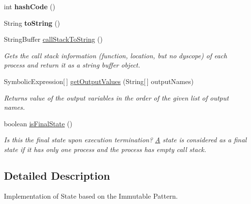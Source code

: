 \begin{DoxyCompactItemize}
\item 
\hypertarget{classedu_1_1udel_1_1cis_1_1vsl_1_1civl_1_1state_1_1common_1_1immutable_1_1ImmutableState_a48efc1dd9996ae1aa123ce1a0b5e66c3}{}int {\bfseries hash\+Code} ()\label{classedu_1_1udel_1_1cis_1_1vsl_1_1civl_1_1state_1_1common_1_1immutable_1_1ImmutableState_a48efc1dd9996ae1aa123ce1a0b5e66c3}

\item 
\hypertarget{classedu_1_1udel_1_1cis_1_1vsl_1_1civl_1_1state_1_1common_1_1immutable_1_1ImmutableState_abcc292e5aeed6b8eba3007833239f175}{}String {\bfseries to\+String} ()\label{classedu_1_1udel_1_1cis_1_1vsl_1_1civl_1_1state_1_1common_1_1immutable_1_1ImmutableState_abcc292e5aeed6b8eba3007833239f175}

\item 
String\+Buffer \hyperlink{classedu_1_1udel_1_1cis_1_1vsl_1_1civl_1_1state_1_1common_1_1immutable_1_1ImmutableState_a3eee65c1506e5fc43db2b12685515e9d}{call\+Stack\+To\+String} ()
\begin{DoxyCompactList}\small\item\em Gets the call stack information (function, location, but no dyscope) of each process and return it as a string buffer object. \end{DoxyCompactList}\item 
Symbolic\+Expression\mbox{[}$\,$\mbox{]} \hyperlink{classedu_1_1udel_1_1cis_1_1vsl_1_1civl_1_1state_1_1common_1_1immutable_1_1ImmutableState_a9a738f032e6add7fb30bd537c455b3c4}{get\+Output\+Values} (String\mbox{[}$\,$\mbox{]} output\+Names)
\begin{DoxyCompactList}\small\item\em Returns value of the output variables in the order of the given list of output names. \end{DoxyCompactList}\item 
boolean \hyperlink{classedu_1_1udel_1_1cis_1_1vsl_1_1civl_1_1state_1_1common_1_1immutable_1_1ImmutableState_a9db201bbce5a4c6ec86e9e441055c15d}{is\+Final\+State} ()
\begin{DoxyCompactList}\small\item\em Is this the final state upon execution termination? \hyperlink{structA}{A} state is considered as a final state if it has only one process and the process has empty call stack. \end{DoxyCompactList}\end{DoxyCompactItemize}


\subsection{Detailed Description}
Implementation of State based on the Immutable Pattern. 

